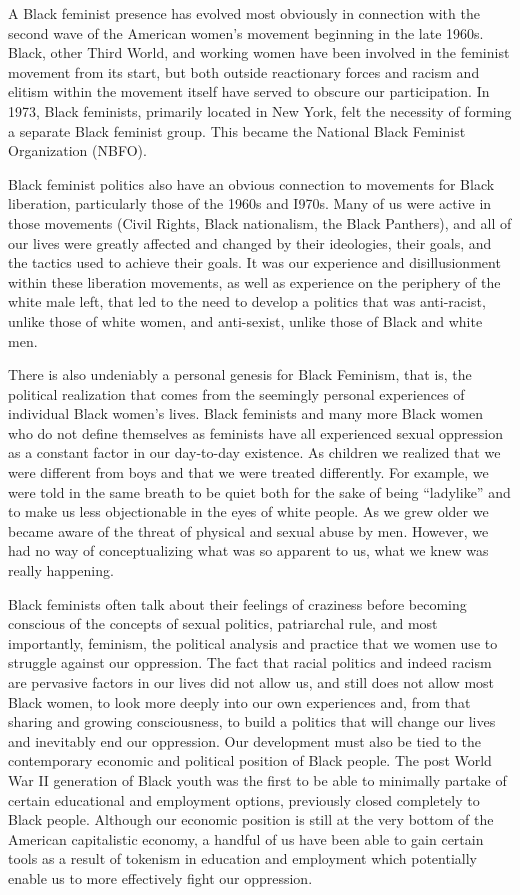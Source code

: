\documentclass{article}
\begin{document}
A Black feminist presence has evolved most obviously in connection with the
second wave of the American women's movement beginning in the late 1960s.
Black, other Third World, and working women have been involved in the feminist
movement from its start, but both outside reactionary forces and racism and
elitism within the movement itself have served to obscure our participation. In
1973, Black feminists, primarily located in New York, felt the necessity of
forming a separate Black feminist group. This became the National Black
Feminist Organization (NBFO).

Black feminist politics also have an obvious connection to movements for Black
liberation, particularly those of the 1960s and I970s. Many of us were active
in those movements (Civil Rights, Black nationalism, the Black Panthers), and
all of our lives were greatly affected and changed by their ideologies, their
goals, and the tactics used to achieve their goals. It was our experience and
disillusionment within these liberation movements, as well as experience on the
periphery of the white male left, that led to the need to develop a politics
that was anti-racist, unlike those of white women, and anti-sexist, unlike
those of Black and white men.

There is also undeniably a personal genesis for Black Feminism, that is, the
political realization that comes from the seemingly personal experiences of
individual Black women's lives. Black feminists and many more Black women who
do not define themselves as feminists have all experienced sexual oppression as
a constant factor in our day-to-day existence. As children we realized that we
were different from boys and that we were treated differently. For example, we
were told in the same breath to be quiet both for the sake of being
``ladylike'' and to make us less objectionable in the eyes of white people. As
we grew older we became aware of the threat of physical and sexual abuse by
men. However, we had no way of conceptualizing what was so apparent to us, what
we knew was really happening.

Black feminists often talk about their feelings of craziness before becoming
conscious of the concepts of sexual politics, patriarchal rule, and most
importantly, feminism, the political analysis and practice that we women use to
struggle against our oppression. The fact that racial politics and indeed
racism are pervasive factors in our lives did not allow us, and still does not
allow most Black women, to look more deeply into our own experiences and, from
that sharing and growing consciousness, to build a politics that will change
our lives and inevitably end our oppression. Our development must also be tied
to the contemporary economic and political position of Black people. The post
World War II generation of Black youth was the first to be able to minimally
partake of certain educational and employment options, previously closed
completely to Black people. Although our economic position is still at the very
bottom of the American capitalistic economy, a handful of us have been able to
gain certain tools as a result of tokenism in education and employment which
potentially enable us to more effectively fight our oppression.
\end{document}
